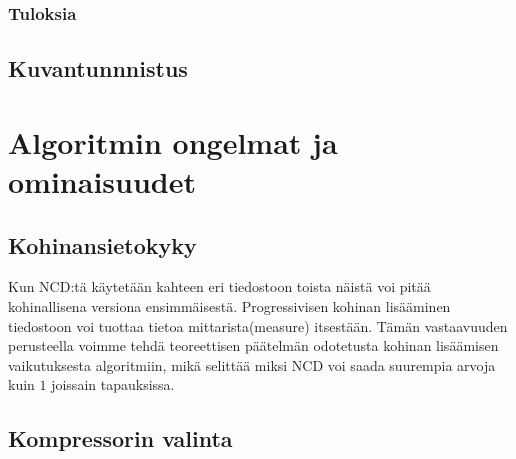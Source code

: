 \documentclass[11pt,finnish]{tktltiki2}
\theoremstyle{definition}
\theoremstyle{remark}
\begin{document}
    \subsubsection{Tuloksia} %
    \label{ssub:tuloksia}

  \subsection{Kuvantunnnistus} %
  \label{sub:kuvantunnnistus}


\section{Algoritmin ongelmat ja ominaisuudet} %
\label{sec:algoritmin_ongelmat_ja_ominaisuudet}
  \subsection{Kohinansietokyky} %
  \label{sub:kohinansietokyky}
    Kun NCD:tä käytetään kahteen eri tiedostoon toista näistä voi pitää kohinallisena versiona ensimmäisestä. Progressivisen kohinan lisääminen tiedostoon voi tuottaa tietoa mittarista(measure) itsestään. Tämän vastaavuuden perusteella voimme tehdä teoreettisen päätelmän odotetusta kohinan lisäämisen vaikutuksesta algoritmiin, mikä selittää miksi NCD voi saada suurempia arvoja kuin $1$ joissain tapauksissa. \cite{4167725}


  \subsection{Kompressorin valinta} %
  \label{sub:kompressorin_valinta}

    \iffalse
      This paper shows that the compressors used to compute the normalized compression distance are not idempotent in some cases, being strongly skewed with the size of the objects and window size, and therefore causing a deviation in the identity property of the distance if we don’t take care that the objects to be compressed fit the windows. The relationship underlying the precision of the distance and the size of the objects has been analyzed for several well-known compressors, and specially in depth for three cases, bzip2, gzip and PPMZ which are examples of the three main types of compressors: block-sorting, Lempel-Ziv, and statistic.
    \fi
\end{document}
